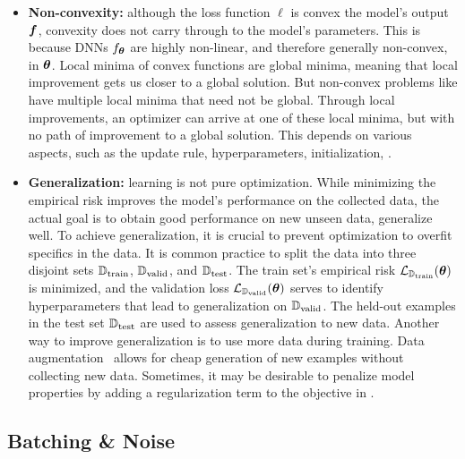 \begin{itemize}
\item \textbf{Non-convexity:} although the loss function $\ell$ is convex \wrt
  the model's output ${\bm{f}}$, convexity does not carry through to the model's
  parameters. This is because DNNs $f_{{\bm{\theta}}}$ are highly
  non-linear, and therefore generally non-convex, in ${\bm{\theta}}$. Local minima of
  convex functions are global minima, meaning that local improvement gets us
  closer to a global solution. But non-convex problems like
   have multiple local minima
  that need not be global. Through local improvements, an optimizer can arrive
  at one of these local minima, but with no path of improvement to a global
  solution. This depends on various aspects, such as the update rule,
  hyperparameters, initialization, \etc.

\item \textbf{Generalization:} learning is not pure optimization. While
  minimizing the empirical risk 
  improves the model's performance on the collected data, the actual goal is to
  obtain good performance on new unseen data, \ie generalize well. To achieve
  generalization, it is crucial to prevent optimization to overfit specifics in
  the data.
  It is common practice to split the data into three disjoint sets ${\mathbb{D}}_{\mathrm{train}}$,
  ${\mathbb{D}}_{\mathrm{valid}}$, and ${\mathbb{D}}_{\mathrm{test}}$. The train set's empirical risk
  ${\mathcal{L}}_{{\mathbb{D}}_{\mathrm{train}}}({\bm{\theta}})$ is minimized, and the validation loss
  ${\mathcal{L}}_{{\mathbb{D}}_{\mathrm{valid}}}({\bm{\theta}})$ serves to identify hyperparameters that lead to
  generalization on ${\mathbb{D}}_{\mathrm{valid}}$. The held-out examples in the test set ${\mathbb{D}}_{\mathrm{test}}$
  are used to assess generalization to new data.
  Another way to improve generalization is to use more data during training.
  Data augmentation~\cite{shorten2019survey} allows for cheap generation of new
  examples without collecting new data.
  Sometimes, it may be desirable to penalize model properties by adding a
  regularization term to the objective in
  .
\end{itemize}

\subsection{Batching \& Noise}\label{sec:background::MiniBatching}

